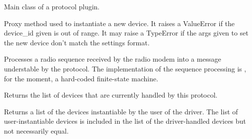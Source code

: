 \documentclass[letterpaper,10pt,english]{sphinxmanual}
\begin{document}
\begin{fulllineitems}
\label{implementation_examples:protocols.nexa.Nexa}
Main class of a protocol plugin.

\begin{fulllineitems}
\label{implementation_examples:protocols.nexa.Nexa.add_device}
Proxy method used to instantiate a new device. It raises a 
ValueError if the device\_id given is out of range. It may raise 
a TypeError if the args given to set the new device don't match 
the settings format.

\end{fulllineitems}


\begin{fulllineitems}
\label{implementation_examples:protocols.nexa.Nexa.decode_sequence}
Processes a radio sequence received by the radio modem 
into a message understable by the protocol.
The implementation of the sequence processing is , for the
moment, a hard-coded finite-state machine.

\end{fulllineitems}


\begin{fulllineitems}
\label{implementation_examples:protocols.nexa.Nexa.get_devices}
Returns the list of devices that are currently handled 
by this protocol.

\end{fulllineitems}


\begin{fulllineitems}
\label{implementation_examples:protocols.nexa.Nexa.get_instantiable_devices}
Returns a list of the devices instantiable by the user
of the driver. 
The list of user-instantiable devices is included in the 
list of the driver-handled devices but not necessarily 
equal.


\end{fulllineitems}
\end{fulllineitems}
\end{document}
